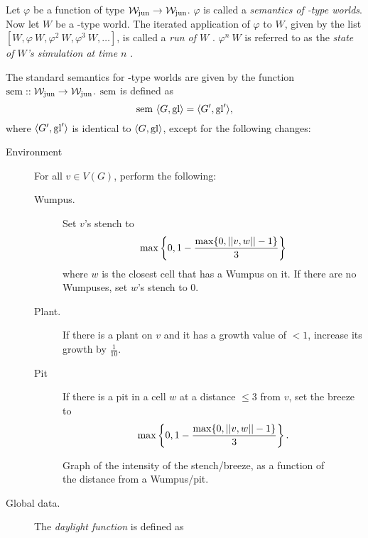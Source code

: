 \begin{definition}
Let $\varphi$ be a function of type $\mathcal{W}_{\mathrm{jun}} \rightarrow \mathcal{W}_{\mathrm{jun}}$. $\varphi$ is called a {\em semantics of \wjun-type worlds}.
Now let $W$ be a \wjun-type world. The iterated application of $\varphi$ to $W$, given by the list ${[W, \varphi\ W, \varphi^2\ W, \varphi^3\ W, \dots]}$, is called a {\em run of $W$ }. $\varphi^n\ W$ is referred to as the {\em state of $W$'s simulation at time $n$ }.
\end{definition}

\begin{definition}
\label{def:ssem}
The standard semantics for \wjun-type worlds are given by the function $\mathrm{sem} :: \mathtt{\mathcal{W}_{\mathrm{jun}} \rightarrow \mathcal{W}_{\mathrm{jun}}}$. $\mathrm{sem}$ is defined as 
$$\mathrm{sem}\ \langle G, \mathrm{gl} \rangle = \langle G', \mathrm{gl}' \rangle, $$
where $\langle G', \mathrm{gl}' \rangle$ is identical to $\langle G, \mathrm{gl} \rangle$, except for the following changes:

\begin{description}
	\item[Environment] For all $v \in V(G)$, perform the following:
	
	\begin{description}
		\item[Wumpus.] Set $v$'s stench to
		$$
			\mathrm{max}\left\{0, 1 - \frac{\mathrm{max}\{0,||{v},{w}||-1\}}{3}\right\}
		$$
		where $w$ is the closest cell that has a Wumpus on it. If there are no Wumpuses, set $w$'s stench to 0.
		
		\item[Plant.] If there is a plant on $v$ and it has a growth value of $< 1$, increase its growth by $\frac{1}{10}$.
		
		\item[Pit] If there is a pit in a cell $w$ at a distance $\leq 3$ from $v$, set the breeze to
 		$$
			\mathrm{max}\left\{0, 1 - \frac{\mathrm{max}\{0,||{v},{w}||-1\}}{3}\right\}.
		$$
	\end{description}
	
	\begin{figure}
		\centering
		\label{fig:stenchIntensity}
		
		\caption{Graph of the intensity of the stench/breeze, as a function of the distance from a Wumpus/pit.}
	\end{figure}
	
	\item[Global data.] The {\em daylight function} is defined as
	

\end{description}
\end{definition}
